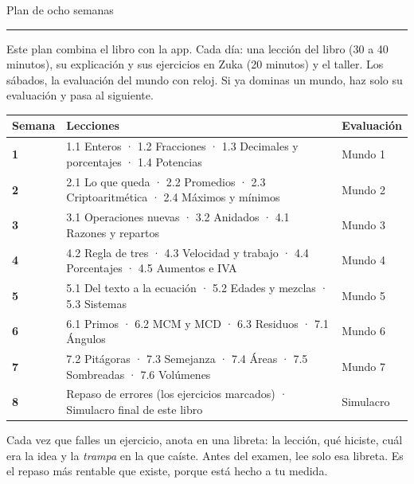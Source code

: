 \clearpage\renewcommand{\zuka@mundoactual}{Plan de estudio}
{\sffamily\fontsize{26}{30}\selectfont\firalight Plan de ocho semanas\par}\vspace{2pt}
{\color{zlime}\rule{18mm}{1.6pt}}\par\vspace{6pt}
{\small Este plan combina el libro con la app. Cada día: una lección del libro (30 a 40 minutos), su
explicación y sus ejercicios en Zuka (20 minutos) y el taller. Los sábados, la evaluación del mundo con reloj. Si ya dominas un mundo, haz solo
su evaluación y pasa al siguiente.\par}
\vspace{6pt}
\begin{center}\small
\begin{tabularx}{\linewidth}{@{}>{\sffamily\bfseries\color{zolive}}lX>{\raggedleft\arraybackslash}p{24mm}@{}}
\toprule
\textbf{Semana} & \textbf{Lecciones} & \textbf{Evaluación}\\\midrule
1 & 1.1 Enteros · 1.2 Fracciones · 1.3 Decimales y porcentajes · 1.4 Potencias & Mundo 1\\
2 & 2.1 Lo que queda · 2.2 Promedios · 2.3 Criptoaritmética · 2.4 Máximos y mínimos & Mundo 2\\
3 & 3.1 Operaciones nuevas · 3.2 Anidados · 4.1 Razones y repartos & Mundo 3\\
4 & 4.2 Regla de tres · 4.3 Velocidad y trabajo · 4.4 Porcentajes · 4.5 Aumentos e IVA & Mundo 4\\
5 & 5.1 Del texto a la ecuación · 5.2 Edades y mezclas · 5.3 Sistemas & Mundo 5\\
6 & 6.1 Primos · 6.2 MCM y MCD · 6.3 Residuos · 7.1 Ángulos & Mundo 6\\
7 & 7.2 Pitágoras · 7.3 Semejanza · 7.4 Áreas · 7.5 Sombreadas · 7.6 Volúmenes & Mundo 7\\
8 & Repaso de errores (los ejercicios marcados) · Simulacro final de este libro & Simulacro\\
\bottomrule
\end{tabularx}
\end{center}

\begin{tcolorbox}[enhanced,colback=zsoft,boxrule=0pt,arc=3pt,left=5mm,right=5mm]
\par\vspace{2pt}
Cada vez que falles un ejercicio, anota en una libreta: la lección, qué hiciste, cuál era la idea y la
\emph{trampa} en la que caíste. Antes del examen, lee solo esa libreta. Es el repaso más rentable que existe, porque está
hecho a tu medida.
\end{tcolorbox}

